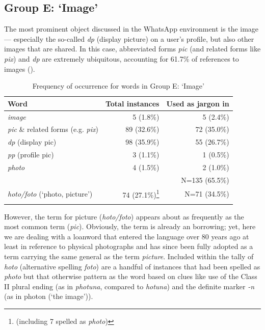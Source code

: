 \documentclass[output=paper
,newtxmath
,modfonts
,nonflat]{langsci/langscibook}
\begin{document}
\subsection{Group E: ‘Image’}

The most prominent object discussed in the WhatsApp environment is the image — especially the so-called \textit{dp} (display picture) on a user’s profile, but also other images that are shared. In this case, abbreviated  forms \textit{pic} (and related forms like \textit{pix}) and \textit{dp} are extremely ubiquitous, accounting for 61.7\% of references to images ().

\begin{table}
\begin{tabularx}{\textwidth}{Qrr}
\lsptoprule
 Word & Total instances &  Used as jargon in \\
\midrule
\textit{image}                                    & 5 (1.8\%)   & 5 (2.4\%)\\
\textit{pic} \& related forms (e.g. \textit{pix}) & 89 (32.6\%) & 72 (35.0\%)\\
\textit{dp} (display pic)                         & 98 (35.9\%) & 55 (26.7\%)\\
\textit{pp} (profile pic)                         & 3 (1.1\%)   & 1 (0.5\%)\\
\textit{photo}                                    & 4 (1.5\%)   & 2 (1.0\%)\\\midrule
& & N=135 (65.5\%)\\\midrule
\textit{hoto/foto}  (‘photo, picture’) & 74 (27.1\%)\footnote{(including 7 spelled as \textit{photo})} & N=71 (34.5\%)\\
\lspbottomrule
\end{tabularx}
\caption{Frequency of occurrence for words in Group E: ‘Image’}
\label{tab:purvis:7}
\end{table} 

However, the  term for picture (\textit{hoto/foto}) appears about as frequently as the most common  term (\textit{pic}). Obviously, the  term is already an  borrowing; yet, here we are dealing with a loanword that entered the  language over 80 years ago at least \citep{bargery1934} in reference to physical photographs and has since been fully adopted as a  term carrying the same general  as the  term \textit{picture}. Included within the tally of  \textit{hoto} (alternative spelling \textit{foto}) are a handful of instances that had been spelled as \textit{photo} but that otherwise pattern as the  word based on clues like use of the Class II plural ending (as in \textit{photuna}, compared to \textit{hotuna}) and the definite marker \textit{{}-n} (as in photon (‘the image’)).
\end{document}
